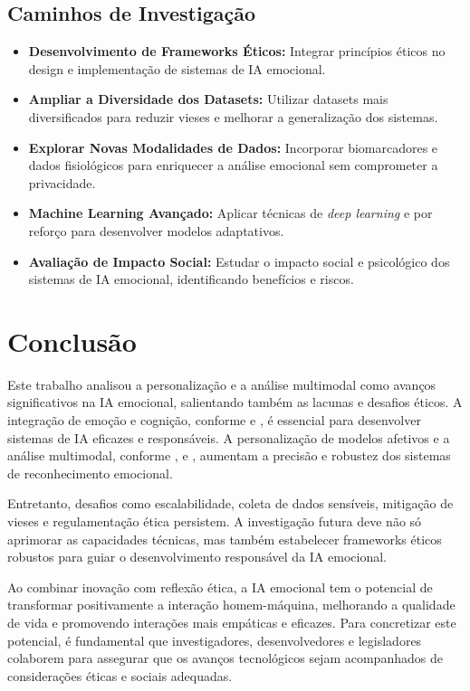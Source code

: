 \documentclass[a4paper,12pt]{report}
\begin{document}
	\subsection{Caminhos de Investigação}
	
	\begin{itemize}
		\item \textbf{Desenvolvimento de Frameworks Éticos:} Integrar princípios éticos no design e implementação de sistemas de IA emocional.
		\item \textbf{Ampliar a Diversidade dos Datasets:} Utilizar datasets mais diversificados para reduzir vieses e melhorar a generalização dos sistemas.
		\item \textbf{Explorar Novas Modalidades de Dados:} Incorporar biomarcadores e dados fisiológicos para enriquecer a análise emocional sem comprometer a privacidade.
		\item \textbf{Machine Learning Avançado:} Aplicar técnicas de \textit{deep learning} e por reforço para desenvolver modelos adaptativos.
		\item \textbf{Avaliação de Impacto Social:} Estudar o impacto social e psicológico dos sistemas de IA emocional, identificando benefícios e riscos.
	\end{itemize}
	
	
	
	
\section{Conclusão}

	Este trabalho analisou a personalização e a análise multimodal como avanços significativos na IA emocional, salientando também as lacunas e desafios éticos. A integração de emoção e cognição, conforme \textcite{pessoa2013} e \textcite{haidt2001}, é essencial para desenvolver sistemas de IA eficazes e responsáveis. A personalização de modelos afetivos e a análise multimodal, conforme \textcite{kargarandehkordi2024}, \textcite{gursesli2024} e \textcite{lee2024}, aumentam a precisão e robustez dos sistemas de reconhecimento emocional.
	
	Entretanto, desafios como escalabilidade, coleta de dados sensíveis, mitigação de vieses e regulamentação ética persistem. A investigação futura deve não só aprimorar as capacidades técnicas, mas também estabelecer frameworks éticos robustos para guiar o desenvolvimento responsável da IA emocional.
	
	Ao combinar inovação com reflexão ética, a IA emocional tem o potencial de transformar positivamente a interação homem-máquina, melhorando a qualidade de vida e promovendo interações mais empáticas e eficazes. Para concretizar este potencial, é fundamental que investigadores, desenvolvedores e legisladores colaborem para assegurar que os avanços tecnológicos sejam acompanhados de considerações éticas e sociais adequadas.

	
	\newpage
	
	\printbibliography
	
\end{document}
